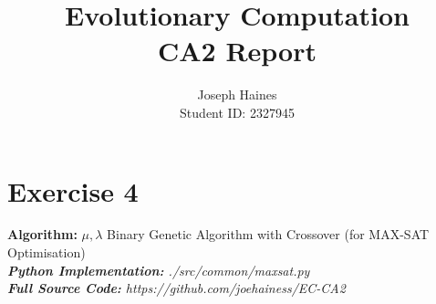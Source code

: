 \documentclass[11pt,a4paper]{article}
\begin{document}
\title{Evolutionary Computation\\CA2 Report}
\author{
Joseph Haines\\
\small{Student ID: 2327945}
}

\maketitle


\section*{Exercise 4}
\label{sec:exercise-4}



\textbf{Algorithm:} $\mu,\lambda$ Binary Genetic Algorithm with Crossover (for MAX-SAT Optimisation) \\
\textit{\textbf{Python Implementation:} ./src/common/maxsat.py} \\
\textit{\textbf{Full Source Code:} https://github.com/joehainess/EC-CA2} \\
\end{document}
